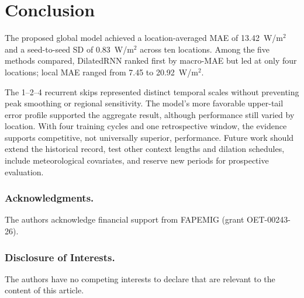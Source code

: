 \documentclass[runningheads]{llncs}
\begin{document}
\section{Conclusion}
\label{sec:conclusion}

The proposed global model achieved a location-averaged MAE of 13.42~W/m$^2$ and a seed-to-seed SD of 0.83~W/m$^2$ across ten locations. Among the five methods compared, DilatedRNN ranked first by macro-MAE but led at only four locations; local MAE ranged from 7.45 to 20.92~W/m$^2$.

The 1--2--4 recurrent skips represented distinct temporal scales without preventing peak smoothing or regional sensitivity. The model's more favorable upper-tail error profile supported the aggregate result, although performance still varied by location. With four training cycles and one retrospective window, the evidence supports competitive, not universally superior, performance. Future work should extend the historical record, test other context lengths and dilation schedules, include meteorological covariates, and reserve new periods for prospective evaluation.

\begin{credits}
\subsubsection{Acknowledgments.}
The authors acknowledge financial support from FAPEMIG (grant OET-00243-26).

\subsubsection{Disclosure of Interests.}
The authors have no competing interests to declare that are relevant to the content of this article.
\end{credits}
\end{document}
